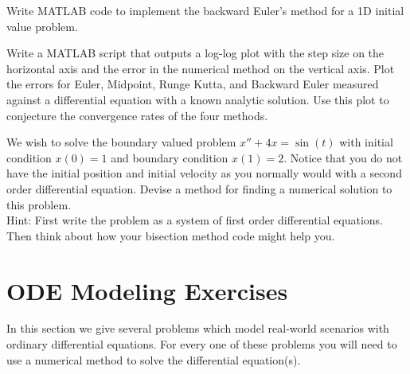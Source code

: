 \begin{problem}
    Write MATLAB code to implement the backward Euler's method for a 1D initial value
    problem. \\
\end{problem}


\begin{problem}
    Write a MATLAB script that outputs a log-log plot with the step size on the horizontal
    axis and the error in the numerical method on the vertical axis.  Plot the errors for
    Euler, Midpoint, Runge Kutta, and Backward Euler measured against a differential
    equation with a known analytic solution.  Use this plot to conjecture the convergence
    rates of the four methods.
\end{problem}

\begin{problem}
    We wish to solve the boundary valued problem $x'' + 4x = \sin(t)$ with initial
    condition $x(0)=1$ and boundary condition $x(1)=2$.  Notice that you do not have the
    initial position and initial velocity as you normally would with a second order
    differential equation.  Devise a method for finding a numerical solution to this
    problem. \\
    Hint: First write the problem as a system of first order differential equations.  Then
    think about how your bisection method code might help you.
\end{problem}


\newpage\section{ODE Modeling Exercises}
In this section we give several problems which model real-world scenarios with ordinary
differential equations.  For every one of these problems you will need to use a numerical
method to solve the differential equation(s).

